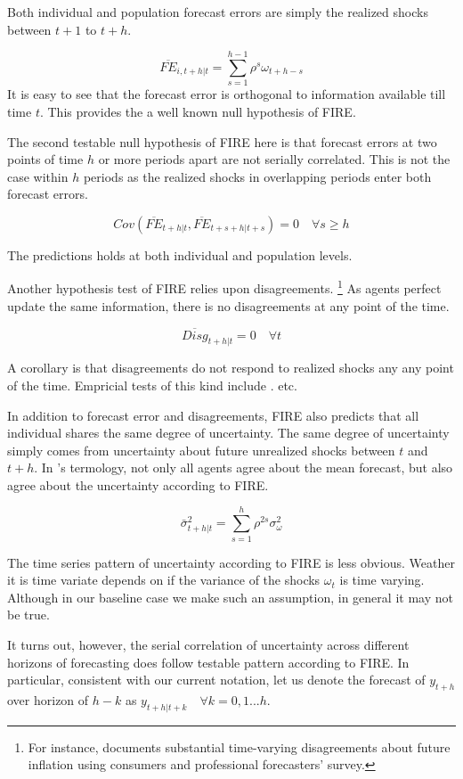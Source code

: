 \documentclass[]{article}
\begin{document}
Both individual and population forecast errors are simply the realized shocks between $t+1$ to $t+h$.  

$$\overline{FE}_{i,t+h|t} = \sum^{h-1}_{s=1} \rho^s \omega_{t+h-s}$$ It is easy to see that the forecast error is orthogonal to information available till time $t$. This provides the a well known null hypothesis of FIRE. \cite{xx}

The second testable null hypothesis of FIRE here is that forecast errors at two points of time $h$ or more periods apart are not serially correlated. This is not the case within $h$ periods as the realized shocks in overlapping periods enter both forecast errors. 

$$Cov(\overline{FE}_{t+h|t}, \overline{FE}_{t+s+h|t+s}) = 0 \quad \forall s \geq h$$

The predictions holds at both individual and population levels. 

Another hypothesis test of FIRE relies upon disagreements. \footnote{For instance, \cite{mankiw2003disagreement} documents substantial time-varying disagreements about future inflation using consumers and professional forecasters' survey. } As agents perfect update the same information, there is no disagreements at any point of the time. 

$$\overline{Disg}_{t+h|t}=0 \quad \forall t$$

A corollary is that disagreements do not respond to realized shocks any any point of the time.  Empricial tests of this kind include \cite{xx}.\cite{xx} etc. 

In addition to forecast error and disagreements, FIRE also predicts that all individual shares the same degree of uncertainty. The same degree of uncertainty simply comes from uncertainty about future unrealized shocks between $t$ and $t+h$. In \cite{}'s termology, not only all agents agree about the mean forecast, but also agree about the uncertainty according to FIRE. 

$$\bar \sigma^2_{t+h|t} = \sum^{h}_{s=1}\rho^{2s} \sigma^2_{\omega}$$

The time series pattern of uncertainty according to FIRE is less obvious. Weather it is time variate depends on if the variance of the shocks $\omega_t$ is time varying. Although in our baseline case we make such an assumption, in general it may not be true. 

It turns out, however, the serial correlation of uncertainty across different horizons of forecasting does follow testable pattern according to FIRE. In particular, consistent with our current notation, let us denote the forecast of $y_{t+h}$ over horizon of $h-k$ as $y_{t+h|t+k} \quad \forall k =0,1...h$. 
\end{document}

